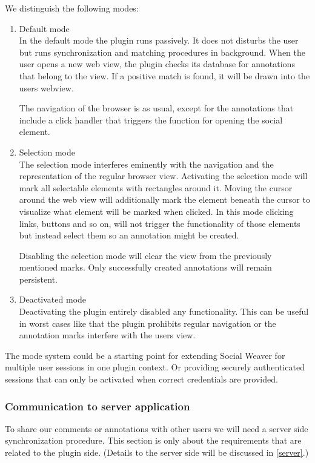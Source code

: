 We distinguish the following modes:
\begin{enumerate}
\item Default mode \\

In the default mode the plugin runs passively. It does not disturbs the user but runs synchronization and matching procedures in background. When the user opens a new web view, the plugin checks its database for annotations that belong to the view. If a positive match is found, it will be drawn into the users webview. 

The navigation of the browser is as usual, except for the annotations that include a click handler that triggers the function for opening the social element.

\item Selection mode \\ 

The selection mode interferes eminently with the navigation and the representation of the regular browser view. Activating the selection mode will mark all selectable elements with rectangles around it. Moving the cursor around the web view will additionally mark the element beneath the cursor to visualize what element will be marked when clicked. 
In this  mode clicking links, buttons and so on, will not trigger the functionality of those elements but instead select them so an annotation might be created. 

Disabling the selection mode will clear the view from the previously mentioned marks. Only successfully created annotations will remain persistent. 

\item Deactivated mode \\ 

Deactivating the plugin entirely disabled any functionality. This can be useful in worst cases like that the plugin prohibits regular navigation or the annotation marks interfere with the users view.
\end{enumerate}

The mode system could be a starting point for extending Social Weaver for multiple user sessions in one plugin context. Or providing securely authenticated sessions that can only be activated when correct credentials are provided. 

\subsubsection{Communication to server application}
To share our comments or annotations with other users we will need a server side synchronization procedure. This section is only about the requirements that are related to the plugin side. (Details to the server side will be discussed in  \ref{server}.)

